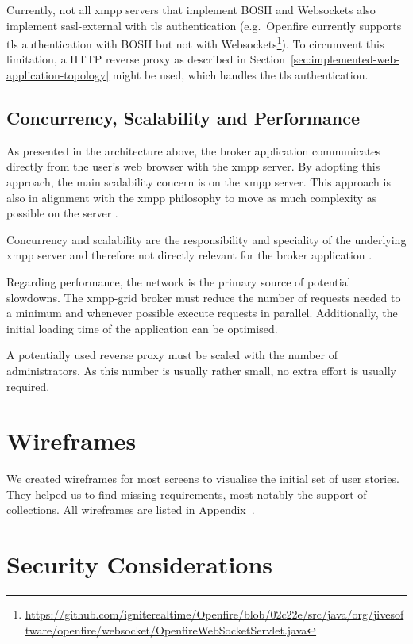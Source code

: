 Currently, not all \gls{xmpp} servers that implement BOSH and Websockets also implement \gls{sasl-external} with \gls{tls} authentication
(e.g.\ Openfire currently supports \gls{tls} authentication with BOSH but not with Websockets\footnote{\url{https://github.com/igniterealtime/Openfire/blob/02c22e/src/java/org/jivesoftware/openfire/websocket/OpenfireWebSocketServlet.java}}).
To circumvent this limitation, a HTTP reverse proxy as described in Section~\ref{sec:implemented-web-application-topology} might be used, which handles the \gls{tls} authentication.

\subsection{Concurrency, Scalability and Performance}

As presented in the architecture above, the \gls{broker} application communicates directly from the user's web browser with the \gls{xmpp} server.
By adopting this approach, the main scalability concern is on the \gls{xmpp} server.
This approach is also in alignment with the \gls{xmpp} philosophy to move as much complexity as possible on the server \cite{definitive-guide-xmpp}.

Concurrency and scalability are the responsibility and speciality of the underlying \gls{xmpp} server and therefore not directly relevant for the \gls{broker} application \cite{definitive-guide-xmpp}.

Regarding performance, the network is the primary source of potential slowdowns.
The \gls{xmpp-grid} \gls{broker} must reduce the number of requests needed to a minimum and whenever possible execute requests in parallel.
Additionally, the initial loading time of the application can be optimised.

A potentially used reverse proxy must be scaled with the number of administrators.
As this number is usually rather small, no extra effort is usually required.

\section{Wireframes}

We created wireframes for most screens to visualise the initial set of user stories.
They helped us to find missing requirements, most notably the support of collections.
All wireframes are listed in Appendix~.

\section{Security Considerations}\label{sec:security-considerations}


